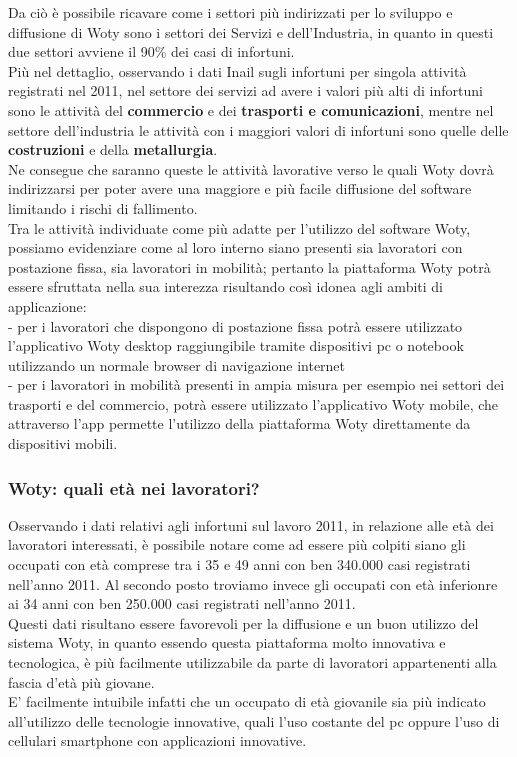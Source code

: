 Da ciò è possibile ricavare come i settori più indirizzati per lo sviluppo e diffusione di Woty sono i settori dei Servizi e dell'Industria, in quanto in questi due settori avviene il 90\% dei casi di infortuni.\\
Più nel dettaglio, osservando i dati Inail sugli infortuni per singola attività registrati nel 2011, nel settore dei servizi ad avere i valori più alti di infortuni sono le attività del \textbf{commercio} e dei \textbf{trasporti e comunicazioni}, mentre nel settore dell'industria le attività con i maggiori valori di infortuni sono quelle delle \textbf{costruzioni} e della \textbf{metallurgia}.\\
Ne consegue che saranno queste le attività lavorative verso le quali Woty dovrà indirizzarsi per poter avere una maggiore e più facile diffusione del software limitando i rischi di fallimento.\\


Tra le attività individuate come più adatte per l'utilizzo del software Woty, possiamo evidenziare come al loro interno siano presenti sia lavoratori con postazione fissa, sia lavoratori in mobilità; pertanto la piattaforma Woty potrà essere sfruttata nella sua interezza risultando così idonea agli ambiti di applicazione:\\
- per i lavoratori che dispongono di postazione fissa potrà essere utilizzato l'applicativo Woty desktop raggiungibile tramite dispositivi pc o notebook utilizzando un normale browser di navigazione internet\\
- per i lavoratori in mobilità presenti in ampia misura per esempio nei settori dei trasporti e del commercio, potrà essere utilizzato l'applicativo Woty mobile, che attraverso l'app permette l'utilizzo della piattaforma Woty direttamente da dispositivi mobili.



\subsubsection{Woty: quali età nei lavoratori?}
Osservando i dati relativi agli infortuni sul lavoro 2011, in relazione alle età dei lavoratori interessati, è possibile notare come ad essere più colpiti siano gli occupati con età comprese tra i 35 e 49 anni con ben 340.000 casi registrati nell'anno 2011.
Al secondo posto troviamo invece gli occupati con età inferionre ai 34 anni con ben 250.000 casi registrati nell'anno 2011.\\
Questi dati risultano essere favorevoli per la diffusione e un buon utilizzo del sistema Woty, in quanto essendo questa piattaforma molto innovativa e tecnologica, è più facilmente utilizzabile da parte di lavoratori appartenenti alla fascia d'età più giovane.\\
E' facilmente intuibile infatti che un occupato di età giovanile sia più indicato all'utilizzo delle tecnologie innovative, quali l'uso costante del pc oppure l'uso di cellulari smartphone con applicazioni innovative.



